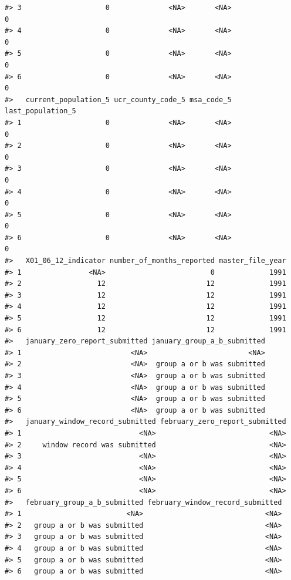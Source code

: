 \documentclass[
]{krantz}
\begin{document}
\begin{verbatim}
#> 3                    0              <NA>       <NA>                 0
#> 4                    0              <NA>       <NA>                 0
#> 5                    0              <NA>       <NA>                 0
#> 6                    0              <NA>       <NA>                 0
#>   current_population_5 ucr_county_code_5 msa_code_5 last_population_5
#> 1                    0              <NA>       <NA>                 0
#> 2                    0              <NA>       <NA>                 0
#> 3                    0              <NA>       <NA>                 0
#> 4                    0              <NA>       <NA>                 0
#> 5                    0              <NA>       <NA>                 0
#> 6                    0              <NA>       <NA>                 0
#>   X01_06_12_indicator number_of_months_reported master_file_year
#> 1                <NA>                         0             1991
#> 2                  12                        12             1991
#> 3                  12                        12             1991
#> 4                  12                        12             1991
#> 5                  12                        12             1991
#> 6                  12                        12             1991
#>   january_zero_report_submitted january_group_a_b_submitted
#> 1                          <NA>                        <NA>
#> 2                          <NA>  group a or b was submitted
#> 3                          <NA>  group a or b was submitted
#> 4                          <NA>  group a or b was submitted
#> 5                          <NA>  group a or b was submitted
#> 6                          <NA>  group a or b was submitted
#>   january_window_record_submitted february_zero_report_submitted
#> 1                            <NA>                           <NA>
#> 2     window record was submitted                           <NA>
#> 3                            <NA>                           <NA>
#> 4                            <NA>                           <NA>
#> 5                            <NA>                           <NA>
#> 6                            <NA>                           <NA>
#>   february_group_a_b_submitted february_window_record_submitted
#> 1                         <NA>                             <NA>
#> 2   group a or b was submitted                             <NA>
#> 3   group a or b was submitted                             <NA>
#> 4   group a or b was submitted                             <NA>
#> 5   group a or b was submitted                             <NA>
#> 6   group a or b was submitted                             <NA>

\end{verbatim}
\end{document}
